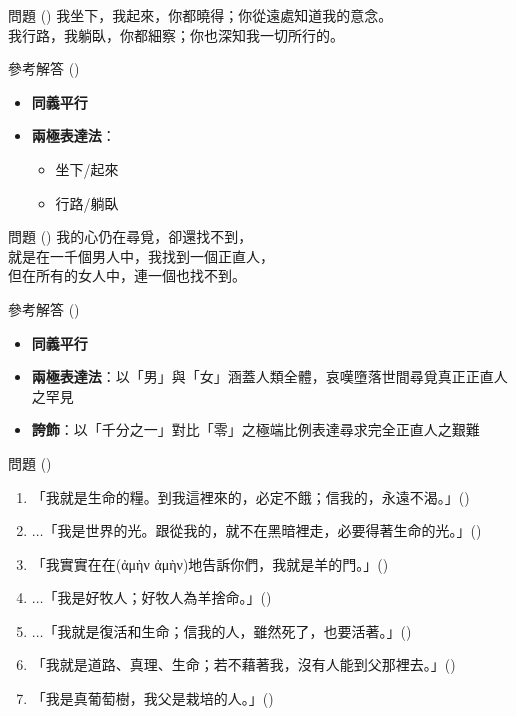 \documentclass{beamer}
\begin{document}
\begin{frame}{問題 ()}
  我坐下，我起來，你都曉得；你從遠處知道我的意念。\\
  我行路，我躺臥，你都細察；你也深知我一切所行的。
\end{frame}

\begin{frame}{參考解答 ()}
  \begin{itemize}
    \item\textbf{同義平行}
    \item\textbf{兩極表達法}：
      \begin{itemize}
        \item 坐下/起來
        \item 行路/躺臥
      \end{itemize}
  \end{itemize}
\end{frame}

\begin{frame}{問題 ()}
  我的心仍在尋覓，卻還找不到，\\
  就是在一千個男人中，我找到一個正直人，\\
  但在所有的女人中，連一個也找不到。
\end{frame}

\begin{frame}{參考解答 ()}
  \begin{itemize}
    \item\textbf{同義平行}
    \item\textbf{兩極表達法}：以「男」與「女」涵蓋人類全體，哀嘆墮落世間尋覓真正正直人之罕見
    \item\textbf{誇飾}：以「千分之一」對比「零」之極端比例表達尋求完全正直人之艱難
  \end{itemize}
\end{frame}

\begin{frame}{問題 ()}
  \begin{enumerate}
    \item 「我就是生命的糧。到我這裡來的，必定不餓；信我的，永遠不渴。」()
    \item $\dots$「我是世界的光。跟從我的，就不在黑暗裡走，必要得著生命的光。」()
    \item 「我實實在在(\textgreek{ἀμὴν ἀμὴν})地告訴你們，我就是羊的門。」()
    \item $\dots$「我是好牧人；好牧人為羊捨命。」()
    \item $\dots$「我就是復活和生命；信我的人，雖然死了，也要活著。」()
    \item 「我就是道路、真理、生命；若不藉著我，沒有人能到父那裡去。」()
    \item 「我是真葡萄樹，我父是栽培的人。」()
  \end{enumerate}
\end{frame}
\end{document}

